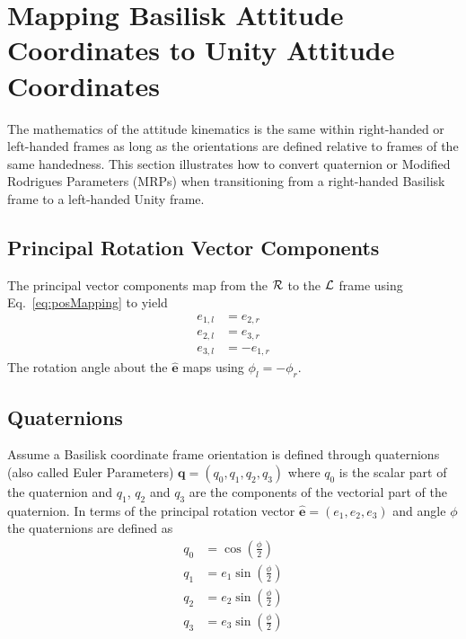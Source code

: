 \documentclass[]{BasiliskReportMemo}
\begin{document}
\section{Mapping Basilisk Attitude Coordinates to Unity Attitude Coordinates}
The mathematics of the attitude kinematics is the same within right-handed or left-handed frames as long as the orientations are defined relative to frames of the same handedness.  This section illustrates how to convert quaternion or Modified Rodrigues Parameters (MRPs)\cite{schaub} when transitioning from a right-handed Basilisk frame to a left-handed Unity frame.  

\subsection{Principal Rotation Vector Components}
The principal vector components map from the $\cal R$ to the $\cal L$ frame using Eq.~\eqref{eq:posMapping} to yield
\begin{subequations}
\label{eq:eHat}
\begin{align}
	e_{1,l} &= e_{2,r}
	\\
	e_{2,l} &= e_{3,r}
	\\
	e_{3,l} &= -e_{1,r}
\end{align}
\end{subequations}
 The rotation angle about the $\hat{\bm e}$ maps using $\phi_{l} = - \phi_{r}$. 
 
\subsection{Quaternions}
Assume a Basilisk coordinate frame orientation is defined through  quaternions (also called Euler Parameters) $\bm q = (q_{0}, q_{1}, q_{2}, q_{3})$ where $q_{0}$ is the scalar part of the quaternion and $q_{1}$, $q_{2}$ and $q_{3}$ are the components of the vectorial part of the quaternion.  In terms of the principal rotation vector $\hat{\bm e} = (e_{1}, e_{2}, e_{3})$ and angle $\phi$ the quaternions are defined as\cite{schaub}
\begin{subequations}
\label{eq:quaternion}
\begin{align}
	q_{0} &= \cos\left( \frac{\phi}{2} \right) \\
	q_{1} &=  e_{1} \sin\left( \frac{\phi}{2} \right) \\
	q_{2} &=  e_{2} \sin\left( \frac{\phi}{2} \right) \\
	q_{3} &=  e_{3} \sin\left( \frac{\phi}{2} \right) 
\end{align}
\end{subequations}
\end{document}
